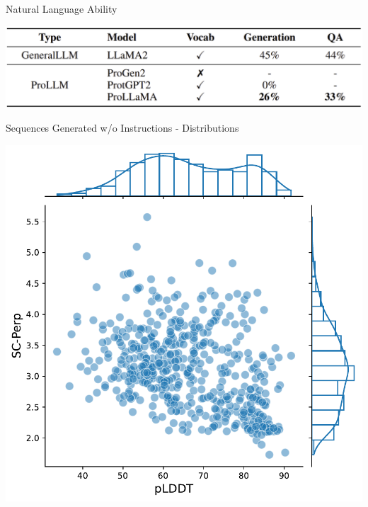\documentclass[dvipsnames]{beamer}
\begin{document}
\begin{frame}{Natural Language Ability}
	\begin{center}
		\includegraphics[scale=0.21]{tables/natural_language_ability_comparison.png}
	\end{center}
\end{frame}

\begin{frame}{Sequences Generated w/o Instructions - Distributions}
	\begin{center}
		\includegraphics[scale=0.35]{images/plddt_scperp.pdf}

\end{center}
\end{frame}
\end{document}
